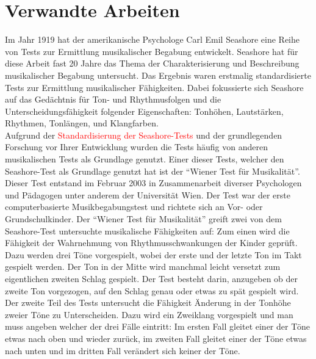 \documentclass{acm_proc_article-sp}
\begin{document}
\section{Verwandte Arbeiten}
Im Jahr 1919 hat der amerikanische Psychologe Carl Emil Seashore eine Reihe von Tests zur Ermittlung musikalischer Begabung entwickelt\cite{gordon:2000}. Seashore hat für diese Arbeit fast 20 Jahre das Thema der Charakterisierung und Beschreibung musikalischer Begabung untersucht. Das Ergebnis waren erstmalig standardisierte Tests zur Ermittlung musikalischer Fähigkeiten. Dabei fokussierte sich Seashore auf das Gedächtnis für Ton- und Rhythmusfolgen und die Unterscheidungsfähigkeit folgender Eigenschaften: Tonhöhen, Lautstärken, Rhythmen, Tonlängen, und Klangfarben.\\
Aufgrund der \textcolor{red}{Standardisierung der Seashore-Tests} und der grundlegenden Forschung vor Ihrer Entwicklung wurden die Tests häufig von anderen musikalischen Tests als Grundlage genutzt. 
Einer dieser Tests, welcher den Seashore-Test als Grundlage genutzt hat ist der "`Wiener Test für Musikalität"'\cite{laengle:2003}. Dieser Test entstand im Februar 2003 in Zusammenarbeit diverser Psychologen und Pädagogen unter anderem der Universität Wien. Der Test war der erste computerbasierte Musikbegabungstest und richtete sich an Vor- oder Grundschulkinder. Der "`Wiener Test für Musikalität"' greift zwei von dem Seashore-Test untersuchte musikalische Fähigkeiten auf: Zum einen wird die Fähigkeit der Wahrnehmung von Rhythmusschwankungen der Kinder geprüft. Dazu werden drei Töne vorgespielt, wobei der erste und der letzte Ton im Takt gespielt werden. Der Ton in der Mitte wird manchmal leicht versetzt zum eigentlichen zweiten Schlag gespielt. Der Test besteht darin, anzugeben ob der zweite Ton vorgezogen, auf den Schlag genau oder etwas zu spät gespielt wird.\\
Der zweite Teil des Tests untersucht die Fähigkeit Änderung in der Tonhöhe zweier Töne zu Unterscheiden. Dazu wird ein Zweiklang vorgespielt und man muss angeben welcher der drei Fälle eintritt: Im ersten Fall gleitet einer der Töne etwas nach oben und wieder zurück, im zweiten Fall gleitet einer der Töne etwas nach unten und im dritten Fall verändert sich keiner der Töne.
\end{document}
